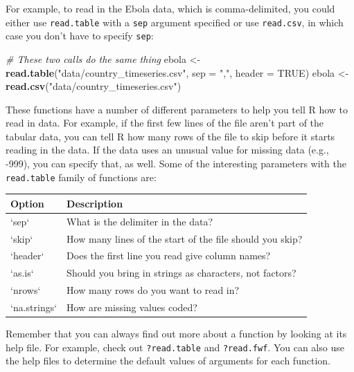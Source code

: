 \documentclass[]{book}
\makeatletter
\newenvironment{Shaded}{\begin{snugshade}}{\end{snugshade}}
\newcommand{\KeywordTok}[1]{\textcolor[rgb]{0.13,0.29,0.53}{\textbf{{#1}}}}
\newcommand{\DataTypeTok}[1]{\textcolor[rgb]{0.13,0.29,0.53}{{#1}}}
\newcommand{\StringTok}[1]{\textcolor[rgb]{0.31,0.60,0.02}{{#1}}}
\newcommand{\CommentTok}[1]{\textcolor[rgb]{0.56,0.35,0.01}{\textit{{#1}}}}
\newcommand{\OtherTok}[1]{\textcolor[rgb]{0.56,0.35,0.01}{{#1}}}
\newcommand{\NormalTok}[1]{{#1}}
\newenvironment{kframe}{%
\medskip{}
\setlength{\fboxsep}{.8em}
 \def\at@end@of@kframe{}%
 \ifinner\ifhmode%
  \def\at@end@of@kframe{\end{minipage}}%
  \begin{minipage}{\columnwidth}%
 \fi\fi%
 \def\FrameCommand##1{\hskip\@totalleftmargin \hskip-\fboxsep
 \colorbox{shadecolor}{##1}\hskip-\fboxsep
     \hskip-\linewidth \hskip-\@totalleftmargin \hskip\columnwidth}%
 \MakeFramed {\advance\hsize-\width
   \@totalleftmargin\z@ \linewidth\hsize
   \@setminipage}}%
 {\par\unskip\endMakeFramed%
 \at@end@of@kframe}
\renewenvironment{Shaded}{\begin{kframe}}{\end{kframe}}
\newenvironment{rmdblock}[1]
  {
  \begin{itemize}
  \renewcommand{\labelitemi}{
    \raisebox{-.7\height}[0pt][0pt]{
      {\setkeys{Gin}{width=3em,keepaspectratio}\texttt{[image: images/\#1]}}
    }
  }
  \setlength{\fboxsep}{1em}
  \begin{kframe}
  \item
  }
  {
  \end{kframe}
  \end{itemize}
  }
\newenvironment{rmdnote}
  {\begin{rmdblock}{note}}
  {\end{rmdblock}}
\makeatother
\begin{document}
For example, to read in the Ebola data, which is comma-delimited, you
could either use \texttt{read.table} with a \texttt{sep} argument
specified or use \texttt{read.csv}, in which case you don't have to
specify \texttt{sep}:

\begin{Shaded}
\begin{Highlighting}[]
\CommentTok{# These two calls do the same thing}
\NormalTok{ebola <-}\StringTok{ }\KeywordTok{read.table}\NormalTok{(}\StringTok{"data/country_timeseries.csv"}\NormalTok{, }\DataTypeTok{sep =} \StringTok{","}\NormalTok{,}
                    \DataTypeTok{header =} \OtherTok{TRUE}\NormalTok{)}
\NormalTok{ebola <-}\StringTok{ }\KeywordTok{read.csv}\NormalTok{(}\StringTok{"data/country_timeseries.csv"}\NormalTok{)}
\end{Highlighting}
\end{Shaded}

These functions have a number of different parameters to help you tell R
how to read in data. For example, if the first few lines of the file
aren't part of the tabular data, you can tell R how many rows of the
file to skip before it starts reading in the data. If the data uses an
unusual value for missing data (e.g., -999), you can specify that, as
well. Some of the interesting parameters with the \texttt{read.table}
family of functions are:

\begin{tabular}{l|l}
\hline
Option & Description\\
\hline
`sep` & What is the delimiter in the data?\\
\hline
`skip` & How many lines of the start of the file should you skip?\\
\hline
`header` & Does the first line you read give column names?\\
\hline
`as.is` & Should you bring in strings as characters, not factors?\\
\hline
`nrows` & How many rows do you want to read in?\\
\hline
`na.strings` & How are missing values coded?\\
\hline
\end{tabular}

\begin{rmdnote}
Remember that you can always find out more about a function by looking
at its help file. For example, check out \texttt{?read.table} and
\texttt{?read.fwf}. You can also use the help files to determine the
default values of arguments for each function.
\end{rmdnote}
\end{document}
